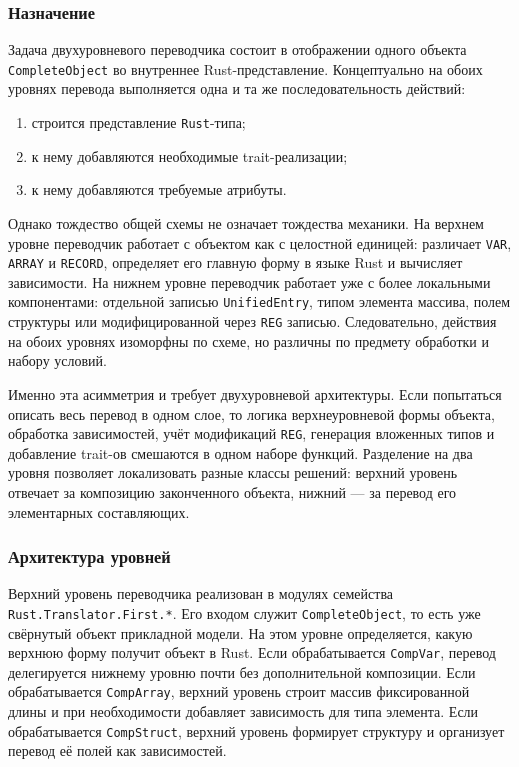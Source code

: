 \documentclass[a4paper,12pt]{article}
\begin{document}
\subsubsection{Назначение}

Задача двухуровневого переводчика состоит в отображении одного объекта
\texttt{CompleteObject} во внутреннее Rust-представление. Концептуально на обоих уровнях
перевода выполняется одна и та же последовательность действий:
\begin{enumerate}
  \item строится представление \texttt{Rust}-типа;
  \item к нему добавляются необходимые trait-реализации;
  \item к нему добавляются требуемые атрибуты.
\end{enumerate}

Однако тождество общей схемы не означает тождества механики. На верхнем уровне
переводчик работает с объектом как с целостной единицей: различает \texttt{VAR},
\texttt{ARRAY} и \texttt{RECORD}, определяет его главную форму в языке Rust и
вычисляет зависимости. На нижнем уровне переводчик работает уже с более локальными
компонентами: отдельной записью \texttt{UnifiedEntry}, типом элемента массива, полем
структуры или модифицированной через \texttt{REG} записью. Следовательно, действия на
обоих уровнях изоморфны по схеме, но различны по предмету обработки и набору условий.

Именно эта асимметрия и требует двухуровневой архитектуры. Если попытаться описать весь
перевод в одном слое, то логика верхнеуровневой формы объекта, обработка зависимостей,
учёт модификаций \texttt{REG}, генерация вложенных типов и добавление trait-ов
смешаются в одном наборе функций. Разделение на два уровня позволяет локализовать
разные классы решений: верхний уровень отвечает за композицию законченного объекта,
нижний --- за перевод его элементарных составляющих.

\subsubsection{Архитектура уровней}

Верхний уровень переводчика реализован в модулях семейства
\texttt{Rust.Translator.First.*}. Его входом служит \texttt{CompleteObject}, то есть уже
свёрнутый объект прикладной модели. На этом уровне определяется, какую верхнюю форму
получит объект в Rust. Если обрабатывается \texttt{CompVar}, перевод делегируется
нижнему уровню почти без дополнительной композиции. Если обрабатывается
\texttt{CompArray}, верхний уровень строит массив фиксированной длины и при необходимости
добавляет зависимость для типа элемента. Если обрабатывается \texttt{CompStruct},
верхний уровень формирует структуру и организует перевод её полей как зависимостей.
\end{document}
